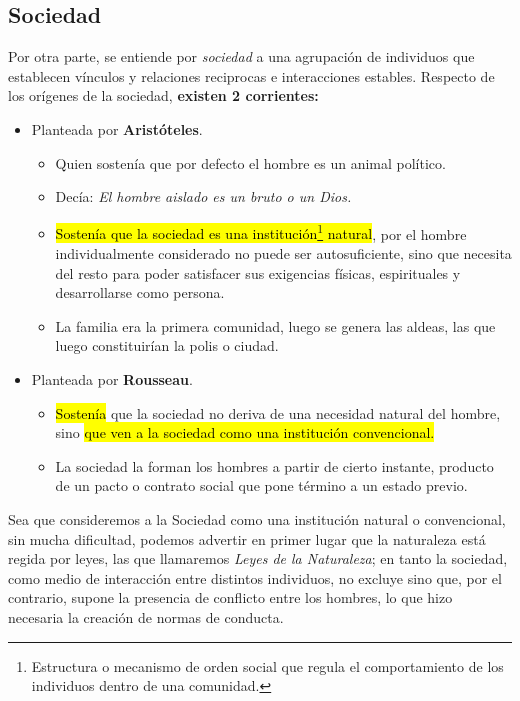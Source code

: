 \documentclass{templateApunte}
\newcommand{\hlcolor}[2]{{\sethlcolor{#1}\hl{#2}}}
\begin{document}
\subsection{Sociedad}
Por otra parte, se entiende por \textit{sociedad} a una agrupación de individuos que establecen vínculos y relaciones reciprocas e interacciones estables.
\newline
Respecto de los orígenes de la sociedad, \textbf{existen 2 corrientes:}
\begin{itemize}
  \item Planteada por \textbf{Aristóteles}. 
  \begin{itemize} 
    \item Quien sostenía que por defecto el hombre es un animal político.
    \item Decía: \textit{El hombre aislado es un bruto o un Dios.}
    \item \hlcolor{Amarillo!80}{Sostenía que la sociedad es una institución\footnote{Estructura o mecanismo de orden social que regula el comportamiento de los individuos dentro de una comunidad.} natural}, por el hombre individualmente considerado no puede ser autosuficiente, sino que necesita del resto para poder satisfacer sus exigencias físicas, espirituales y desarrollarse como persona.
    \item La familia era la primera comunidad, luego se genera las aldeas, las que luego constituirían la polis o ciudad.
  \end{itemize}

  \newpage
  \item Planteada por \textbf{Rousseau}.
  \begin{itemize}
    \item \hlcolor{Amarillo!80}{Sostenía} que la sociedad no deriva de una necesidad natural del hombre, sino \hlcolor{Amarillo!80}{que ven a la sociedad como una institución convencional.}
    \item La sociedad la forman los hombres a partir de cierto instante, producto de un pacto o contrato social que pone término a un estado previo.
  \end{itemize}
\end{itemize}
Sea que consideremos a la Sociedad como una institución natural o convencional, sin mucha dificultad, podemos advertir en primer lugar que la naturaleza está regida por leyes, las que llamaremos \textit{Leyes de la Naturaleza}; en tanto la sociedad, como medio de interacción entre distintos individuos, no excluye sino que, por el contrario, supone la presencia de conflicto entre los hombres, lo que hizo necesaria la creación de normas de conducta.
\end{document}
